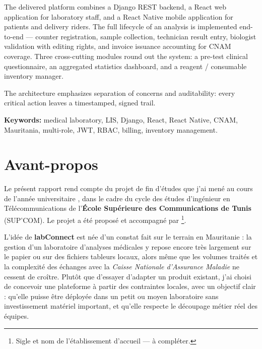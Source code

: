\documentclass[12pt, a4paper, oneside]{report}
\begin{document}
The delivered platform combines a Django REST backend, a React web
application for laboratory staff, and a React Native mobile application
for patients and delivery riders. The full lifecycle of an analysis is
implemented end-to-end — counter registration, sample collection,
technician result entry, biologist validation with editing rights, and
invoice issuance accounting for CNAM coverage. Three cross-cutting
modules round out the system: a pre-test clinical questionnaire,
an aggregated statistics dashboard, and a reagent / consumable inventory
manager.

The architecture emphasizes separation of concerns and auditability:
every critical action leaves a timestamped, signed trail.

\vspace{1em}
\noindent\textbf{Keywords:} medical laboratory, LIS, Django, React,
React Native, CNAM, Mauritania, multi-role, JWT, RBAC, billing,
inventory management.

\newpage

\chapter*{Avant-propos}

Le présent rapport rend compte du projet de fin d'études que j'ai mené
au cours de l'année universitaire \underline{\hspace{2cm}}, dans le cadre
du cycle des études d'ingénieur en Télécommunications de l'\textbf{École
Supérieure des Communications de Tunis} (SUP'COM). Le projet a été
proposé et accompagné par \underline{\hspace{6cm}}\footnote{Sigle et
nom de l'établissement d'accueil — à compléter.}.

L'idée de \textbf{labConnect} est née d'un constat fait sur le terrain
en Mauritanie : la gestion d'un laboratoire d'analyses médicales y
repose encore très largement sur le papier ou sur des fichiers tableurs
locaux, alors même que les volumes traités et la complexité des
échanges avec la \emph{Caisse Nationale d'Assurance Maladie} ne cessent
de croître. Plutôt que d'essayer d'adapter un produit existant, j'ai
choisi de concevoir une plateforme à partir des contraintes locales,
avec un objectif clair : qu'elle puisse être déployée dans un petit ou
moyen laboratoire sans investissement matériel important, et qu'elle
respecte le découpage métier réel des équipes.
\end{document}
